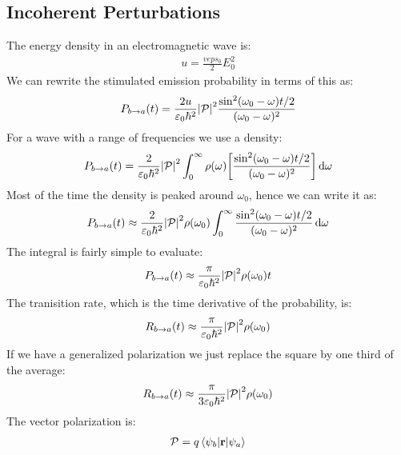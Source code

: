 \subsection{Incoherent Perturbations}
The energy density in an electromagnetic wave is:
\begin{align*}
  u=\frac{veps_0}{2}E_0^2
\end{align*}
We can rewrite the stimulated emission probability in terms of this as:
\begin{align*}
  P_{b\to a}(t)=\frac{2u}{\varepsilon_0\hbar^2}\abs{\mathcal{P}}^2
  \frac{\sin^2(\omega_0-\omega)t/2}{(\omega_0-\omega)^2}
\end{align*}
For a wave with a range of frequencies we use a density:
\begin{align*}
  P_{b\to a}(t)=\frac{2}{\varepsilon_0\hbar^2}\abs{\mathcal{P}}^2\int_0^\infty\rho(\omega)
  \qty[\frac{\sin^2(\omega_0-\omega)t/2}{(\omega_0-\omega)^2}]\dd{\omega}
\end{align*}
Most of the time the density is peaked around $\omega_0$, hence we can write it as:
\begin{align*}
  P_{b\to a}(t)\approx\frac{2}{\varepsilon_0\hbar^2}\abs{\mathcal{P}}^2\rho(\omega_0)\int_0^\infty
  \frac{\sin^2(\omega_0-\omega)t/2}{(\omega_0-\omega)^2}\dd{\omega}
\end{align*}
The integral is fairly simple to evaluate:
\begin{align*}
  P_{b\to a}(t)\approx\frac{\pi}{\varepsilon_0\hbar^2}\abs{\mathcal{P}}^2\rho(\omega_0)t
\end{align*}
The tranisition rate, which is the time derivative of the probability, is:
\begin{align*}
  R_{b\to a}(t)\approx\frac{\pi}{\varepsilon_0\hbar^2}\abs{\mathcal{P}}^2\rho(\omega_0)
\end{align*}
If we have a generalized polarization we just replace the square by one third of the average:
\begin{align*}
  R_{b\to a}(t)\approx\frac{\pi}{3\varepsilon_0\hbar^2}\abs{\vb{\mathcal{P}}}^2\rho(\omega_0)
\end{align*}
The vector polarization is:
\begin{align*}
  \vb{\mathcal{P}}=q\mel{\psi_b}{\vb{r}}{\psi_a}
\end{align*}
